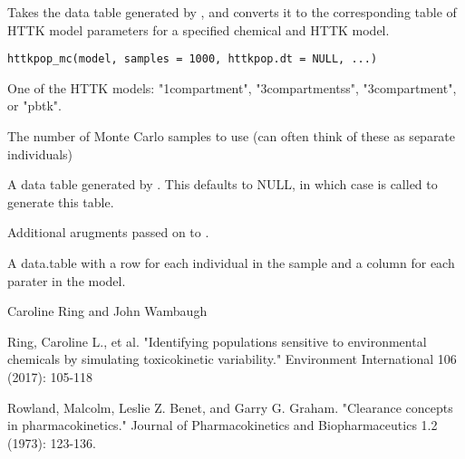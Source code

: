 \documentclass[a4paper]{book}
\begin{document}
%
\begin{Description}\relax
Takes the data table generated by , and converts it
to the corresponding table of HTTK model parameters for a specified chemical
and HTTK model.
\end{Description}
%
\begin{Usage}
\begin{verbatim}
httkpop_mc(model, samples = 1000, httkpop.dt = NULL, ...)
\end{verbatim}
\end{Usage}
%
\begin{Arguments}
\begin{ldescription}
\item[\code{model}] One of the HTTK models: "1compartment", "3compartmentss",
"3compartment", or "pbtk".

\item[\code{samples}] The number of Monte Carlo samples to use (can often think of these
as separate individuals)

\item[\code{httkpop.dt}] A data table generated by .
This defaults to NULL, in which case  is 
called to generate this table.

\item[\code{...}] Additional arugments passed on to .
\end{ldescription}
\end{Arguments}
%
\begin{Value}
A data.table with a row for each individual in the sample and a column for
each parater in the model.
\end{Value}
%
\begin{Author}\relax
Caroline Ring and John Wambaugh
\end{Author}
%
\begin{References}\relax
Ring, Caroline L., et al. "Identifying populations sensitive to
environmental chemicals by simulating toxicokinetic variability."
Environment International 106 (2017): 105-118

Rowland, Malcolm, Leslie Z. Benet, and Garry G. Graham. "Clearance concepts
in pharmacokinetics." Journal of Pharmacokinetics and Biopharmaceutics 1.2
(1973): 123-136.
\end{References}
\end{document}

